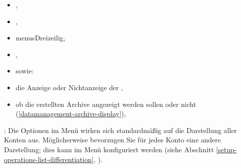 \begin{itemize}
		\begin{itemize} 
			\item {},
			\item {},
			\item menus{Dreizeilig},
			\item {},
			\item[] \hspace{-15pt} sowie:
			\item die Anzeige oder Nichtanzeige der ,
			\item ob die erstellten Archive angezeigt werden sollen oder nicht  (\vref{datamanagement-archive-display}),
		\end{itemize}
	\Note{}: Die Optionen im Menü  wirken sich standardmäßig auf die Darstellung aller Konten aus. Möglicherweise bevorzugen Sie für jedes Konto eine andere Darstellung; dies kann im Menü  konfiguriert werden (siehe Abschnitt \vref{setup-operations-list-differentiation}, ).

\end{itemize}

